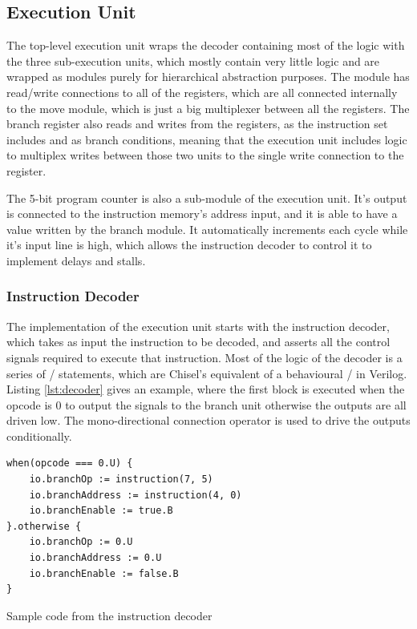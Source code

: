 \subsection{Execution Unit}

The top-level execution unit wraps the decoder containing most of the logic with the three sub-execution units, which mostly contain very little logic and are wrapped as modules purely for hierarchical abstraction purposes. The module has read/write connections to all of the registers, which are all connected internally to the move module, which is just a big multiplexer between all the registers. The branch register also reads and writes from the registers, as the instruction set includes  and  as branch conditions, meaning that the execution unit includes logic to multiplex writes between those two units to the single write connection to the register.

The 5-bit program counter is also a sub-module of the execution unit. It's output is connected to the instruction memory's address input, and it is able to have a value written by the branch module. It automatically increments each cycle while it's  input line is high, which allows the instruction decoder to control it to implement delays and stalls.

\subsubsection{Instruction Decoder}

The implementation of the execution unit starts with the instruction decoder, which takes as input the instruction to be decoded, and asserts all the control signals required to execute that instruction. Most of the logic of the decoder is a series of / statements, which are Chisel's equivalent of a behavioural / in Verilog. Listing \ref{lst:decoder} gives an example, where the first block is executed when the opcode is 0 to output the signals to the branch unit otherwise the outputs are all driven low. The mono-directional connection operator \txt{:=} is used to drive the outputs conditionally.

\begin{listing}[h!]
    \vspace{0.5cm}
    \begin{verbatim}
when(opcode === 0.U) {
    io.branchOp := instruction(7, 5)
    io.branchAddress := instruction(4, 0)
    io.branchEnable := true.B
}.otherwise {
    io.branchOp := 0.U
    io.branchAddress := 0.U
    io.branchEnable := false.B
}
    \end{verbatim}
    \caption{Sample code from the instruction decoder}
    \label{lst:decoder}
\end{listing}

